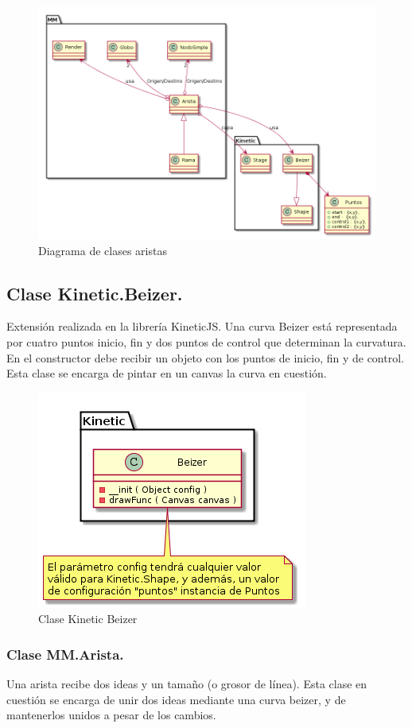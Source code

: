 \begin{figure}[tbph]
\centering
\includegraphics[width=\linewidth]{imagenes/diagrama-clases-mm-aristas}
\caption{Diagrama de clases aristas}
\label{fig:diagrama-clases-mm-aristas}
\end{figure}

\subsection{Clase Kinetic.Beizer.}
Extensión realizada en la librería KineticJS. Una curva Beizer está representada por cuatro puntos inicio, fin y dos puntos de control que determinan la curvatura. En el constructor debe recibir un objeto con los puntos de inicio, fin y de control. Esta clase se encarga de pintar en un canvas la curva en cuestión. 

\begin{figure}[tbph]
\centering
\includegraphics[width=0.5\linewidth]{imagenes/diagrama-clase-kinetic-beizer}
\caption{Clase Kinetic Beizer}
\label{fig:diagrama-clase-kinetic-beizer}
\end{figure}

\subsubsection{Clase MM.Arista.}
Una arista recibe dos ideas y un tamaño (o grosor de línea). Esta clase en cuestión se encarga de unir dos ideas mediante una curva beizer, y de mantenerlos unidos a pesar de los cambios.

